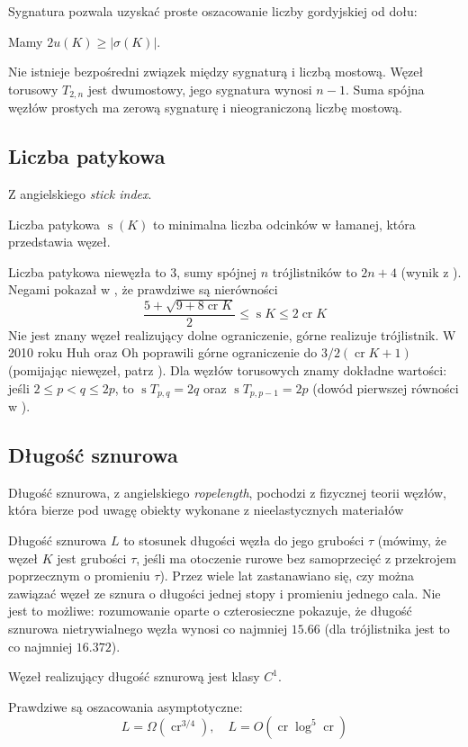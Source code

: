 Sygnatura pozwala uzyskać proste oszacowanie liczby gordyjskiej od dołu:

\begin{proposition}
    Mamy $2 u(K) \ge |\sigma(K)|$.
\end{proposition}

Nie istnieje bezpośredni związek między sygnaturą i liczbą mostową.
Węzeł torusowy $T_{2,n}$ jest dwumostowy, jego sygnatura wynosi $n - 1$.
Suma spójna węzłów prostych ma zerową sygnaturę i nieograniczoną liczbę mostową.


\subsection{Liczba patykowa} %
\label{sub:stick_index}
Z angielskiego \emph{stick index}.

\begin{definition}
    Liczba patykowa $\operatorname{s}(K)$ to minimalna liczba odcinków w łamanej, która przedstawia węzeł.
\end{definition}

Liczba patykowa niewęzła to $3$, sumy spójnej $n$ trójlistników to $2n+4$ (wynik z \cite{greilsheimer97}).
Negami pokazał w \cite{negami91}, że prawdziwe są nierówności
\[
    \frac{5+\sqrt{9 + 8 \operatorname{cr} K}}{2} \le \operatorname{s} K \le 2 \operatorname{cr} K
\]
Nie jest znany węzeł realizujący dolne ograniczenie, górne realizuje trójlistnik.
W 2010 roku Huh oraz Oh poprawili górne ograniczenie do $3/2(\operatorname{cr} K+1)$ (pomijając niewęzeł, patrz \cite{huh11}).
Dla węzłów torusowych znamy dokładne wartości: jeśli $2 \le p < q \le 2p$, to $\operatorname{s} T_{p,q} = 2q$ oraz $\operatorname{s} T_{p, p-1} = 2p$ (dowód pierwszej równości w \cite{jin97}).


\subsection{Długość sznurowa} %
\label{sub:ropelength}
Długość sznurowa, z angielskiego \emph{ropelength}, pochodzi z fizycznej teorii węzłów, która bierze pod uwagę obiekty wykonane z nieelastycznych materiałów

Długość sznurowa $L$ to stosunek długości węzła do jego grubości $\tau$ (mówimy, że węzeł $K$ jest grubości $\tau$, jeśli ma otoczenie rurowe bez samoprzecięć z przekrojem poprzecznym o promieniu $\tau$).
Przez wiele lat zastanawiano się, czy można zawiązać węzeł ze sznura o długości jednej stopy i promieniu jednego cala.
Nie jest to możliwe: rozumowanie oparte o czterosieczne pokazuje, że długość sznurowa nietrywialnego węzła wynosi co najmniej $15.66$ (dla trójlistnika jest to co najmniej $16.372$).

Węzeł realizujący długość sznurową jest klasy $C^1$.

Prawdziwe są oszacowania asymptotyczne:
\[
    L = \Omega (\operatorname{cr}^{3/4}),  \quad
    L = O(\operatorname{cr} \log^5 \operatorname{cr})
\]


